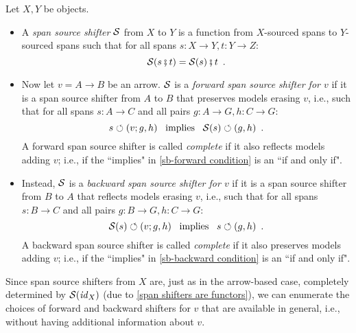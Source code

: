 \begin{definition}
Let $X,Y$ be objects.
\begin{itemize}[topsep=\smallskipamount]
\item A \emph{span source shifter} $\mathcal{S}$ from $X$ to $Y$ is a function from $X$-sourced spans to $Y$-sourced spans 
such that for all spans $s:X\to Y,t:Y\to Z$:
%
\begin{equation}\eqlabel{span shifters are functors}
\cS(s \spcomp t) = \cS(s)\spcomp t \enspace.
\end{equation}
%
\item Now let $v=A\to B$ be an arrow. $\mathcal{S}$ is a \emph{forward span source shifter for $v$} if it is a span source shifter from $A$ to $B$ that preserves models erasing $v$, i.e., such that for all spans $s:A\to C$ and all pairs $g:A\to G,h:C \to G$:
%
\begin{equation}\eqlabel{sb-forward condition}
s\commutes (v;g,h) \enspace\text{ implies }\enspace \cS(s) \commutes (g,h) \enspace.
\end{equation}
%
A forward span source shifter is called \emph{complete} if it also reflects models adding $v$; i.e., if the ``implies" in \eqref{sb-forward condition} is an ``if and only if".

\item Instead, $\mathcal{S}$ is a \emph{backward span source shifter for $v$} if it is a span source shifter from $B$ to $A$ that reflects models erasing $v$, i.e., such that for all spans $s:B\to C$ and all pairs $g:B\to G,h:C\to G$:
%
\begin{equation}\eqlabel{sb-backward condition}
\cS(s) \commutes (v;g,h) \enspace\text{ implies }\enspace s\commutes (g,h) \enspace.
\end{equation}
%
A backward span source shifter is called \emph{complete} if it also preserves models adding $v$; i.e., if the ``implies" in \eqref{sb-backward condition} is an ``if and only if".
\end{itemize}
\end{definition}
%
Since span source shifters from $X$ are, just as in the arrow-based case, completely determined by $\mathcal{S}(\mathit{id}_X)$ (due to \eqref{span shifters are functors}), we can enumerate the choices of forward and backward shifters for $v$ that are available in general, i.e., without having additional information about $v$.
%
